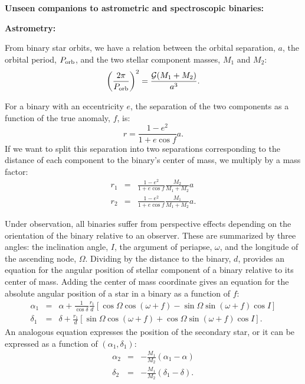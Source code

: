 \documentclass[12pt,preprint]{hackaastex}
\newcommand{\Porb}{\ifmmode {P_{\rm orb}}\else${P_{\rm orb}}$\fi}
\begin{document}
\begin{center}
{\large \textbf{\sc Unseen companions to astrometric and spectroscopic binaries:}}
\end{center}
\normalsize

\vspace{-0.1in}


{\large \textbf{ Astrometry:}}



From binary star orbits, we have a relation between the orbital separation, $a$, the orbital period, \Porb, and the two stellar component masses, $M_1$ and $M_2$:
\begin{equation}
\left( \frac{2 \pi}{\Porb} \right)^2 = \frac{\mathcal{G} (M_1 + M_2) }{a^3}. \label{eq:kepler_3}
\end{equation}

For a binary with an eccentricity $e$, the separation of the two components as a function of the true anomaly, $f$, is:
\begin{equation}
r = \frac{1-e^2}{1+e \cos f} a.
\end{equation} 
If we want to split this separation into two separations corresponding to the distance of each component to the binary's center of mass, we multiply by a mass factor:
\begin{eqnarray}
r_1 &=& \frac{1-e^2}{1+e \cos f} \frac{M_2}{M_1+M_2} a \nonumber \\
r_2 &=& \frac{1-e^2}{1+e \cos f} \frac{M_1}{M_1+M_2} a.
\end{eqnarray}


Under observation, all binaries suffer from perspective effects depending on the orientation of the binary relative to an observer. These are summarized by three angles: the inclination angle, $I$, the argument of periapse, $\omega$, and the longitude of the ascending node, $\Omega$. Dividing by the distance to the binary, $d$, provides an equation for the angular position of stellar component of a binary relative to its center of mass. Adding the center of mass coordinate gives an equation for the absolute angular position of a star in a binary as a function of $f$:
\begin{eqnarray}
\alpha_1 &=& \alpha + \frac{1}{\cos \delta}\frac{r_1}{d} \left[ \cos \Omega \cos (\omega+f) - \sin \Omega \sin(\omega+f) \cos I \right] \nonumber \\
\delta_1 &=& \delta + \frac{r_1}{d} \left[ \sin \Omega \cos (\omega+f) + \cos \Omega \sin(\omega+f) \cos I \right].
\end{eqnarray}
An analogous equation expresses the position of the secondary star, or it can be expressed as a function of $(\alpha_1, \delta_1)$:
\begin{eqnarray}
\alpha_2 &=& -\frac{M_1}{M_2}(\alpha_1 - \alpha) \nonumber \\
\delta_2 &=& -\frac{M_1}{M_2}(\delta_1 - \delta).
\end{eqnarray}
\end{document}

